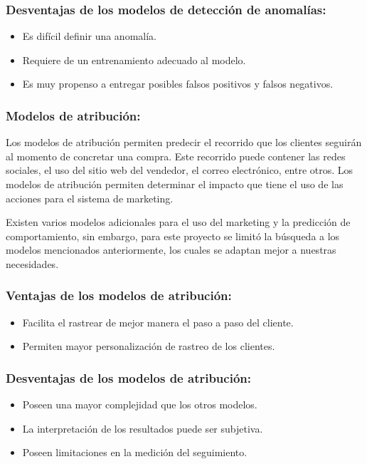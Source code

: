 \subsubsection{Desventajas de los modelos de detección de anomalías:}
\begin{itemize}
    \item Es difícil definir una anomalía.
    \item Requiere de un entrenamiento adecuado al modelo.
    \item Es muy propenso a entregar posibles falsos positivos y falsos negativos.
\end{itemize}

\subsubsection{Modelos de atribución: }
Los modelos de atribución permiten predecir el recorrido que los clientes seguirán al momento de concretar una compra. Este recorrido puede contener las redes sociales, el uso del sitio web del vendedor, el correo electrónico, entre otros. Los modelos de atribución permiten determinar el impacto que tiene el uso de las acciones para el sistema de marketing. 

Existen varios modelos adicionales para el uso del marketing y la predicción de comportamiento, sin embargo, para este proyecto se limitó la búsqueda a los modelos mencionados anteriormente, los cuales se adaptan mejor a nuestras necesidades.

\subsubsection{Ventajas de los modelos de atribución:}
\begin{itemize}
    \item Facilita el rastrear de mejor manera el paso a paso del cliente.
    \item Permiten mayor personalización de rastreo de los clientes.
\end{itemize}

\subsubsection{Desventajas de los modelos de atribución:}
\begin{itemize}
    \item Poseen una mayor complejidad que los otros modelos.
    \item La interpretación de los resultados puede ser subjetiva.
    \item Poseen limitaciones en la medición del seguimiento.
\end{itemize}
